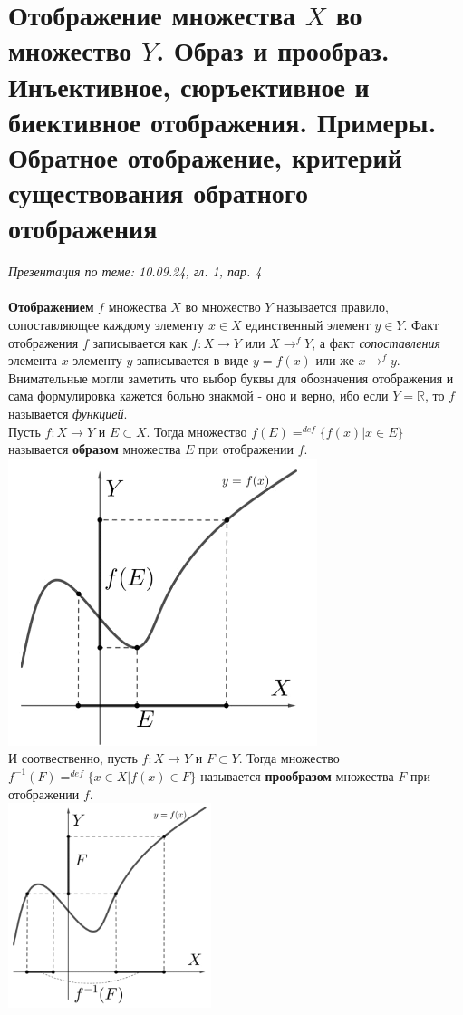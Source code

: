 \documentclass[10pt, a4paper,twocolumn]{article}
\begin{document}
\section{Отображение множества $X$ во множество $Y$. Образ и прообраз. Инъективное, сюръективное и биективное отображения. Примеры. Обратное отображение, критерий существования обратного отображения}
\textsl{Презентация по теме: 10.09.24, гл. 1, пар. 4}
\\ \\
\textbf{Отображением} $f$ множества $X$ во множество $Y$ называется правило, сопоставляющее каждому элементу $x \in X$ единственный элемент $y \in Y$. Факт отображения $f$ записывается как $f : X \to Y$ или $X \rightarrow^{f} Y$, а факт \textsl{сопоставления} элемента $x$ элементу $y$ записывается в виде $y = f(x)$ или же $x \to^{f} y$. Внимательные могли заметить что выбор буквы для обозначения отображения и сама формулировка кажется больно знакмой - оно и верно, ибо если $Y = \mathbb{R}$, то $f$ называется \textsl{функцией}.
\\ Пусть $f : X \to Y$ и $E \subset X$. Тогда множество $f(E) =^{def} \{ f(x) | x \in E \}$ называется \textbf{образом} множества $E$ при отображении $f$.
\\ \includegraphics{obraz}
\\ И соотвественно, пусть $f : X \to Y$ и $F \subset Y$. Тогда множество $f^{-1}(F) =^{def} \{ x \in X | f(x) \in F\}$ называется \textbf{прообразом} множества $F$ при отображении $f$.
\\ \includegraphics{proobraz}
\end{document}
